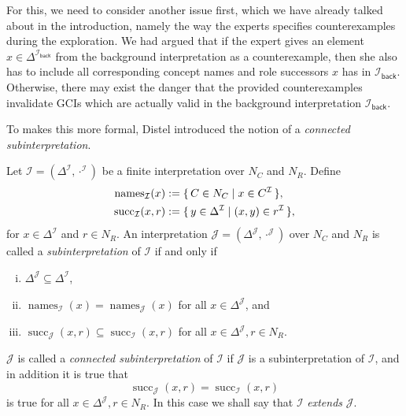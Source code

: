 For this, we need to consider another issue first, which we have already talked about in
the introduction, namely the way the experts specifies counterexamples during the
exploration.  We had argued that if the expert gives an element $x \in
\Delta^{\mathcal{I}_{\mathsf{back}}}$ from the background interpretation as a
counterexample, then she also has to include all corresponding concept names and role
successors $x$ has in $\mathcal{I}_{\mathsf{back}}$.  Otherwise, there may exist the
danger that the provided counterexamples invalidate GCIs which are actually valid in the
background interpretation $\mathcal{I}_{\mathsf{back}}$.

To makes this more formal, Distel introduced the notion of a \emph{connected
  subinterpretation}.

\begin{Definition}
  \label{def:connected-subinterpretations}
  Let $\mathcal{I} = (\Delta^{\mathcal{I}}, \cdot^{\mathcal{I}})$ be a finite
  interpretation over $N_{C}$ and $N_{R}$.  Define%
  \def\succop{\operatorname{succ}}%
  \def\nameop{\operatorname{names}}%
  \begin{align*}
    \nameop_{\mathcal{I}}(x) &:= \set{ C \in N_{C} \mid x \in C^{\mathcal{I}} },\\
    \succop_{\mathcal{I}}(x, r) &:= \set{ y \in \Delta^{\mathcal{I}} \mid (x, y) \in
      r^{\mathcal{I}} },
  \end{align*}
  for $x \in \Delta^{\mathcal{I}}$ and $r \in N_{R}$.  An interpretation $\mathcal{J} =
  (\Delta^{\mathcal{J}}, \cdot^{\mathcal{J}})$ over $N_{C}$ and $N_{R}$ is called a
  \emph{subinterpretation} of $\mathcal{I}$ if and only if
  \begin{enumerate}[i. ]
  \item $\Delta^{\mathcal{J}} \subseteq \Delta^{\mathcal{I}}$,
  \item $\nameop_{\mathcal{I}}(x) = \nameop_{\mathcal{J}}(x)$ for all $x \in
    \Delta^{\mathcal{J}}$, and
  \item $\succop_{\mathcal{J}}(x,r) \subseteq \succop_{\mathcal{I}}(x,r)$ for all $x \in
    \Delta^{\mathcal{J}}, r \in N_{R}$.
  \end{enumerate}
  $\mathcal{J}$ is called a \emph{connected subinterpretation} of $\mathcal{I}$ if
  $\mathcal{J}$ is a subinterpretation of $\mathcal{I}$, and in addition it is true that
  \begin{equation*}
    \succop_{\mathcal{J}}(x, r) = \succop_{\mathcal{I}}(x, r)
  \end{equation*}
  is true for all $x \in \Delta^{\mathcal{J}}, r \in N_{R}$.  In this case we shall say
  that $\mathcal{I}$ \emph{extends} $\mathcal{J}$.
\end{Definition}

